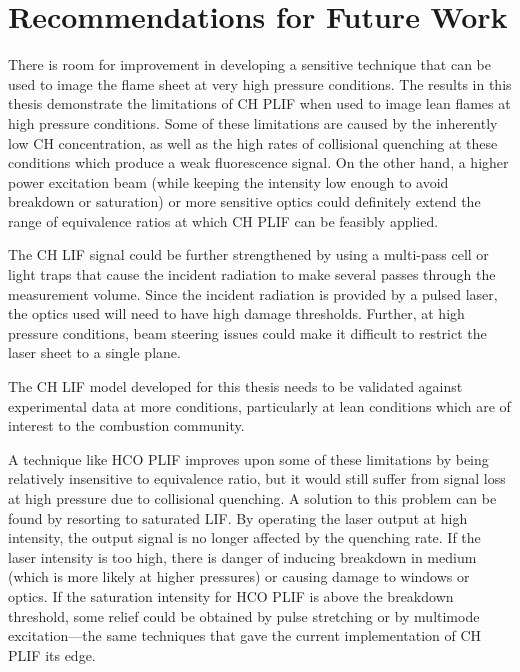 \section{Recommendations for Future Work}

There is room for improvement in developing a sensitive technique that can be used to image the flame sheet at very high pressure conditions.
The results in this thesis demonstrate the limitations of CH PLIF when used to image lean flames at high pressure conditions.
Some of these limitations are caused by the inherently low CH concentration, as well as the high rates of collisional quenching at these conditions which produce a weak fluorescence signal.
On the other hand, a higher power excitation beam (while keeping the intensity low enough to avoid breakdown or saturation) or more sensitive optics could definitely extend the range of equivalence ratios at which CH PLIF can be feasibly applied.

The CH LIF signal could be further strengthened by using a multi-pass cell or light traps that cause the incident radiation to make several passes through the measurement volume.
Since the incident radiation is provided by a pulsed laser, the optics used will need to have high damage thresholds.
Further, at high pressure conditions, beam steering issues could make it difficult to restrict the laser sheet to a single plane.

The CH LIF model developed for this thesis needs to be validated against experimental data at more conditions, particularly at lean conditions which are of interest to the combustion community.

A technique like HCO PLIF improves upon some of these limitations by being relatively insensitive to equivalence ratio, but it would still suffer from signal loss at high pressure due to collisional quenching.
A solution to this problem can be found by resorting to saturated LIF.
By operating the laser output at high intensity, the output signal is no longer affected by the quenching rate.
If the laser intensity is too high, there is danger of inducing breakdown in medium (which is more likely at higher pressures) or causing damage to windows or optics.
If the saturation intensity for HCO PLIF is above the breakdown threshold, some relief could be obtained by pulse stretching or by multimode excitation---the same techniques that gave the current implementation of CH PLIF its edge.

